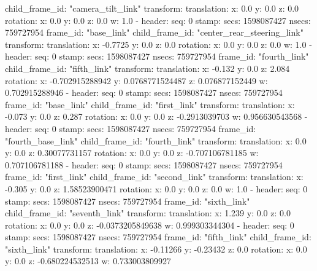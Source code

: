     child_frame_id: "camera_tilt_link"
    transform: 
      translation: 
        x: 0.0
        y: 0.0
        z: 0.0
      rotation: 
        x: 0.0
        y: 0.0
        z: 0.0
        w: 1.0
  - 
    header: 
      seq: 0
      stamp: 
        secs: 1598087427
        nsecs: 759727954
      frame_id: "base_link"
    child_frame_id: "center_rear_steering_link"
    transform: 
      translation: 
        x: -0.7725
        y: 0.0
        z: 0.0
      rotation: 
        x: 0.0
        y: 0.0
        z: 0.0
        w: 1.0
  - 
    header: 
      seq: 0
      stamp: 
        secs: 1598087427
        nsecs: 759727954
      frame_id: "fourth_link"
    child_frame_id: "fifth_link"
    transform: 
      translation: 
        x: -0.132
        y: 0.0
        z: 2.084
      rotation: 
        x: -0.702915288942
        y: 0.0768771524487
        z: 0.076877152449
        w: 0.702915288946
  - 
    header: 
      seq: 0
      stamp: 
        secs: 1598087427
        nsecs: 759727954
      frame_id: "base_link"
    child_frame_id: "first_link"
    transform: 
      translation: 
        x: -0.073
        y: 0.0
        z: 0.287
      rotation: 
        x: 0.0
        y: 0.0
        z: -0.2913039703
        w: 0.956630543568
  - 
    header: 
      seq: 0
      stamp: 
        secs: 1598087427
        nsecs: 759727954
      frame_id: "fourth_base_link"
    child_frame_id: "fourth_link"
    transform: 
      translation: 
        x: 0.0
        y: 0.0
        z: 0.30077731157
      rotation: 
        x: 0.0
        y: 0.0
        z: -0.707106781185
        w: 0.707106781188
  - 
    header: 
      seq: 0
      stamp: 
        secs: 1598087427
        nsecs: 759727954
      frame_id: "first_link"
    child_frame_id: "second_link"
    transform: 
      translation: 
        x: -0.305
        y: 0.0
        z: 1.58523900471
      rotation: 
        x: 0.0
        y: 0.0
        z: 0.0
        w: 1.0
  - 
    header: 
      seq: 0
      stamp: 
        secs: 1598087427
        nsecs: 759727954
      frame_id: "sixth_link"
    child_frame_id: "seventh_link"
    transform: 
      translation: 
        x: 1.239
        y: 0.0
        z: 0.0
      rotation: 
        x: 0.0
        y: 0.0
        z: -0.0373205849638
        w: 0.999303344304
  - 
    header: 
      seq: 0
      stamp: 
        secs: 1598087427
        nsecs: 759727954
      frame_id: "fifth_link"
    child_frame_id: "sixth_link"
    transform: 
      translation: 
        x: -0.11266
        y: -0.23432
        z: 0.0
      rotation: 
        x: 0.0
        y: 0.0
        z: -0.680224532513
        w: 0.733003809927
